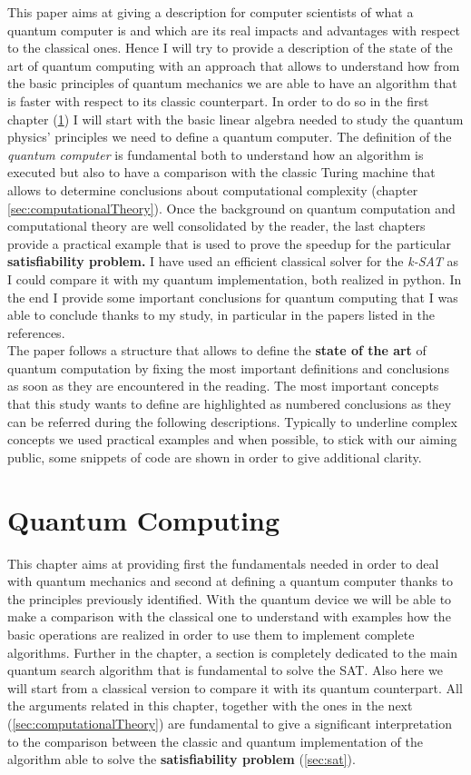 \documentclass[english]{article}
\begin{document}
	This paper aims at giving a description for computer scientists of what a quantum computer is and which are its real impacts and advantages with respect to the classical ones. Hence I will try to provide a description of the state of the art of quantum computing with an approach that allows to understand how from the basic principles of quantum mechanics we are able to have an algorithm that is faster with respect to its classic counterpart. In order to do so in the first chapter (\ref{sec:quantumComputing}) I will start with the basic linear algebra needed to study the quantum physics' principles we need to define a quantum computer. The definition of the \emph{quantum computer} is fundamental both to understand how an algorithm is executed but also to have a comparison with the classic Turing machine that allows to determine conclusions about computational complexity (chapter \ref{sec:computationalTheory}). Once the background on quantum computation and computational theory are well consolidated by the reader, the last chapters provide a practical example that is used to prove the speedup for the particular \textbf{satisfiability problem.} I have used an efficient classical solver for the \emph{k-SAT} as I could compare it with my quantum implementation, both realized in python. In the end I provide some important conclusions for quantum computing that I was able to conclude thanks to my study, in particular in the papers listed in the references. \\
	
	The paper follows a structure that allows to define the \textbf{state of the art} of quantum computation by fixing the most important definitions and conclusions as soon as they are encountered in the reading. The most important concepts that this study wants to define are highlighted as numbered conclusions as they can be referred during the following descriptions. Typically to underline complex concepts we used practical examples and when possible, to stick with our aiming public, some snippets of code are shown in order to give additional clarity.
	
	\section{Quantum Computing}
	\label{sec:quantumComputing}
		This chapter aims at providing first the fundamentals needed in order to deal with quantum mechanics and second at defining a quantum computer thanks to the principles previously identified. With the quantum device we will be able to make a comparison with the classical one to understand with examples how the basic operations are realized in order to use them to implement complete algorithms. Further in the chapter, a section is completely dedicated to the main quantum search algorithm that is fundamental to solve the SAT. Also here we will start from a classical version to compare it with its quantum counterpart. All the arguments related in this chapter, together with the ones in the next (\ref{sec:computationalTheory}) are fundamental to give a significant interpretation to the comparison between the classic and quantum implementation of the algorithm able to solve the \textbf{satisfiability problem} (\ref{sec:sat}).
		
\end{document}
